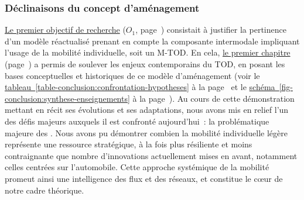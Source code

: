 \begin{refsegment}
\subsubsection*{Déclinaisons du concept d'aménagement
    \label{conclusion-generale:principaux-apports-chapitre1}
    }

\hyperref[objectif-1]{Le premier objectif de recherche} (\(O_1\), page~\pageref{objectif-1}) consistait à justifier la pertinence d'un modèle réactualisé prenant en compte la composante intermodale impliquant l'usage de la mobilité individuelle, soit un \acrshort{M-TOD}. En cela, \hyperref[chap1:titre]{le premier chapitre} (page~\pageref{chap1:titre}) a permis de soulever les enjeux contemporains du \acrshort{TOD}, en posant les bases conceptuelles et historiques de ce modèle d'aménagement (voir le \hyperref[table-conclusion:confrontation-hypotheses]{tableau~\ref{table-conclusion:confrontation-hypotheses}} à la page~\pageref{table-conclusion:confrontation-hypotheses} et le \hyperref[fig-conclusion:synthese-enseignements]{schéma~\ref{fig-conclusion:synthese-enseignements}} à la page~\pageref{fig-conclusion:synthese-enseignements}). Au cours de cette démonstration mettant en récit ses évolutions et ses adaptations, nous avons mis en relief l'un des défis majeurs auxquels il est confronté aujourd'hui~: la problématique majeure des . Nous avons pu démontrer combien la mobilité individuelle légère représente une ressource stratégique, à la fois plus résiliente et moins contraignante que nombre d'innovations actuellement mises en avant, notamment celles centrées sur l'automobile. Cette approche systémique de la mobilité promeut ainsi une intelligence des flux et des réseaux, et constitue le cœur de notre cadre théorique.%


\end{refsegment}
